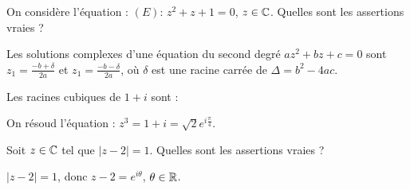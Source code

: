 \begin{question} 
On considère l'équation : $(E) : \, z^2+z+1=0$, $z\in \mathbb{C}$.   Quelles sont les assertions vraies ?
\begin{answers}
    


\end{answers}
\begin{explanations}
Les solutions complexes d'une équation du second degré $az^2+bz+c=0$ sont $z_1=\frac{-b+\delta}{2a}$ et  
$z_1=\frac{-b-\delta}{2a}$, où $\delta$ est une racine carrée de $\Delta=b^2-4ac$.
\end{explanations}

\end{question}




\begin{question} 
Les racines cubiques de $1+i$ sont : 
\begin{answers}


\end{answers}
\begin{explanations}
On résoud l'équation  : $z^3=1+i= \sqrt 2e^{i\frac{\pi}{4}}$.

\end{explanations}

\end{question}





\begin{question} 
Soit $z\in \mathbb{C}$ tel que $|z-2|=1$.  Quelles sont les assertions vraies ?
\begin{answers}


\end{answers}
\begin{explanations}
$|z-2|=1$, donc $z-2=e^{i\theta}$, $\theta \in \mathbb{R}$.

\end{explanations}

\end{question}




